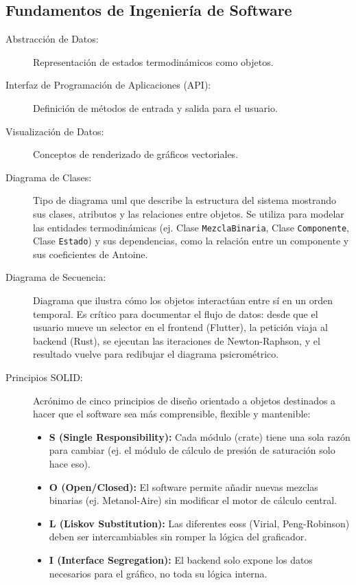 \subsection{Fundamentos de Ingeniería de Software}
    \begin{description}
        \item[Abstracción de Datos:] Representación de estados termodinámicos como objetos.
        \item[Interfaz de Programación de Aplicaciones (API):] Definición de métodos de entrada y salida para el usuario.
        \item[Visualización de Datos:] Conceptos de renderizado de gráficos vectoriales.
        \item[Diagrama de Clases:] Tipo de diagrama \gls{uml} que describe la estructura del sistema mostrando sus clases, atributos y las relaciones entre objetos. Se utiliza para modelar las entidades termodinámicas (ej. Clase \texttt{MezclaBinaria}, Clase \texttt{Componente}, Clase \texttt{Estado}) y sus dependencias, como la relación entre un componente y sus coeficientes de Antoine.
        \item[Diagrama de Secuencia:] Diagrama que ilustra cómo los objetos interactúan entre sí en un orden temporal. Es crítico para documentar el flujo de datos: desde que el usuario mueve un selector en el frontend (Flutter), la petición viaja al backend (Rust), se ejecutan las iteraciones de Newton-Raphson, y el resultado vuelve para redibujar el diagrama psicrométrico.
        \item[Principios SOLID:] Acrónimo de cinco principios de diseño orientado a objetos destinados a hacer que el software sea más comprensible, flexible y mantenible:
            \begin{itemize}
                \item \textbf{S (Single Responsibility):} Cada módulo (crate) tiene una sola razón para cambiar (ej. el módulo de cálculo de presión de saturación solo hace eso).
                \item \textbf{O (Open/Closed):} El software permite añadir nuevas mezclas binarias (ej. Metanol-Aire) sin modificar el motor de cálculo central.
                \item \textbf{L (Liskov Substitution):} Las diferentes \glspl{eos} (Virial, Peng-Robinson) deben ser intercambiables sin romper la lógica del graficador.
                \item \textbf{I (Interface Segregation):} El backend solo expone los datos necesarios para el gráfico, no toda su lógica interna.

\end{itemize}
\end{description}
